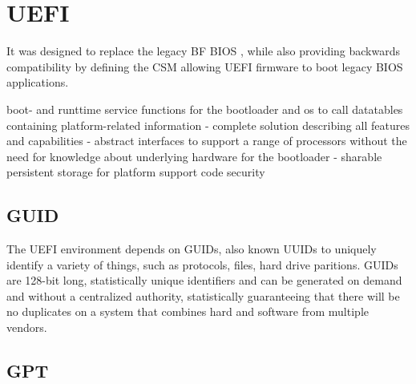 
\section{\acf{UEFI}}


It was designed to replace the legacy \acl{BF} \ac{BIOS} , while also providing backwards compatibility by defining the \acf{CSM} allowing \ac{UEFI} firmware to boot legacy \ac{BIOS} applications.

boot- and runttime service functions for the bootloader and os to call
datatables containing platform-related information
- complete solution describing all features and capabilities
- abstract interfaces to support a range of processors without the need for knowledge about underlying hardware for the bootloader
- sharable persistent storage for platform support code
security

\cite{beyond-bios}

\subsection{\acf{GUID}}

The \ac{UEFI} environment depends on \acp{GUID}, also known \acp{UUID} to uniquely identify a variety of things, such as protocols, files, hard drive paritions.
\acp{GUID} are 128-bit long, statistically unique identifiers and can be generated on demand and without a centralized authority, statistically guaranteeing that there will be no duplicates on a system that combines hard and software from multiple vendors\cite{rfc-4122}.

\subsection{\acf{GPT}}

